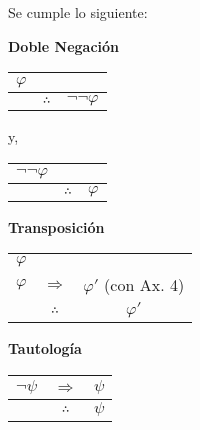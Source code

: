 \documentclass[12pt]{report}
\theoremstyle{largebreak}
\begin{document}
    \begin{propo}
        Se cumple lo siguiente:
        \begin{center}
            \textbf{Doble Negación}
        \end{center}
        \begin{center}
            \begin{tabular}{c c c}
                $\varphi$ &  &  \\
                \hline
                 & $\therefore$ & $\neg\neg\varphi$ \\
            \end{tabular}
        \end{center}
        y,
        \begin{center}
            \begin{tabular}{c c c}
                $\neg\neg\varphi$ &  &  \\
                \hline
                 & $\therefore$ & $\varphi$ \\
            \end{tabular}
        \end{center}
        \begin{center}
            \textbf{Transposición}
        \end{center}
        \begin{center}
            \begin{tabular}{c c c}
                $\varphi$ &  &  \\
                $\varphi$ & $\Rightarrow$ & $\varphi'$ (con Ax. 4) \\
                \hline
                 & $\therefore$ & $\varphi'$ \\
            \end{tabular}
        \end{center}
        \begin{center}
            \textbf{Tautología}
        \end{center}
        \begin{center}
            \begin{tabular}{c c c}
                $\neg\psi$ & $\Rightarrow$ & $\psi$ \\
                \hline
                 & $\therefore$ & $\psi$ \\
            \end{tabular}
        \end{center}
    \end{propo}
\end{document}
